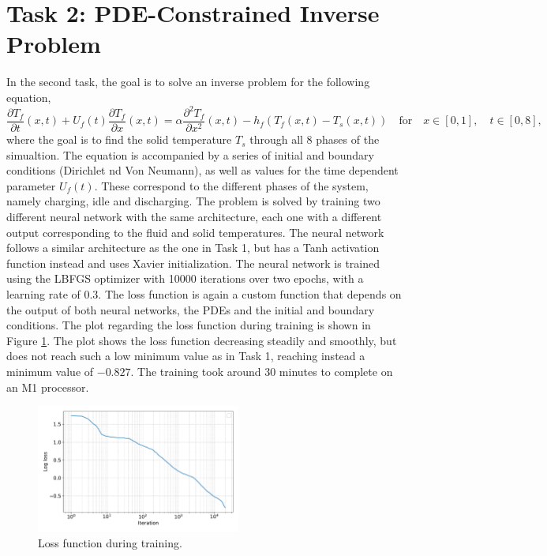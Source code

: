 \documentclass[unicode,11pt,a4paper,oneside,numbers=endperiod,openany]{scrartcl}
\begin{document}
\section{Task 2: PDE-Constrained Inverse Problem}
In the second task, the goal is to solve an inverse problem for the following
equation,
\begin{equation}
    \frac{\partial T_f}{\partial t}(x,t) + U_f(t)\frac{\partial T_f}{\partial x}(x,t) = \alpha \frac{\partial^2 T_f}{\partial x^2} (x,t) - h_f(T_f(x,t)-T_s(x,t)) \quad \text{for} \quad x \in [0, 1], \quad t \in [0, 8],
\end{equation}
where the goal is to find the solid temperature $T_s$ through all 8 phases of
the simualtion. The equation is accompanied by a series of initial and boundary
conditions (Dirichlet nd Von Neumann), as well as values for the time dependent
parameter $U_f(t)$. These correspond to the different phases of the system,
namely charging, idle and discharging. The problem is solved by
training two different neural
network with the same architecture, each one with a different output
corresponding to the fluid and solid temperatures. The neural network follows a
similar architecture as the one in Task 1, but has a Tanh activation function
instead and uses Xavier initialization. 
The neural network is trained using the
LBFGS optimizer with 10000 iterations over two epochs, with a learning rate of 0.3. The loss
function is again a custom function that depends on the output of both neural
networks, the PDEs and the initial and boundary conditions. The plot regarding the loss
function during training is shown in Figure \ref{fig:task2_loss}. The plot shows
the loss function decreasing steadily and smoothly, but does not reach such a
low minimum value as in Task 1, reaching instead a minimum value of $-0.827$.
The training took around 30 minutes to complete on an M1 processor.
\begin{figure}
    \centering
    \includegraphics[width=0.6\textwidth]{../Proj1_Y24/Task2/loss.pdf}
    \caption{Loss function during training.}
    \label{fig:task2_loss}
\end{figure}
\end{document}
